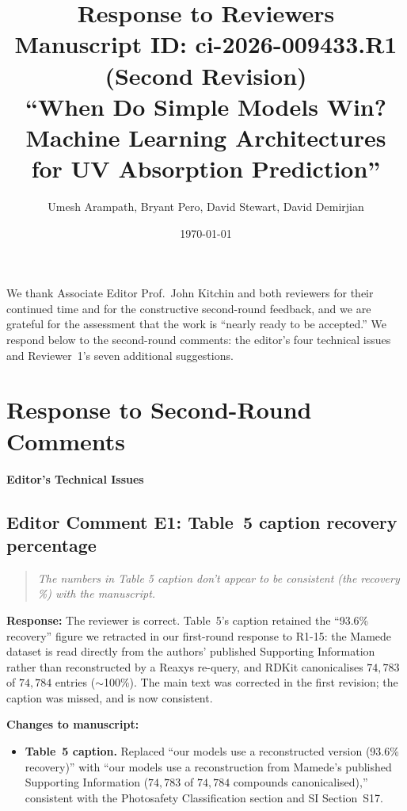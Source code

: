 \documentclass[11pt]{article}
\title{Response to Reviewers\\
\large Manuscript ID: ci-2026-009433.R1 (Second Revision)\\
``When Do Simple Models Win? Machine Learning Architectures for UV Absorption Prediction''}
\author{Umesh Arampath, Bryant Pero, David Stewart, David Demirjian}
\date{\today}
\newenvironment{reviewer}{%
  \begin{quote}\itshape\color{black!70}}{%
  \end{quote}}
\newcommand{\response}[1]{\noindent\textbf{Response:} #1\par\medskip}
\newenvironment{changes}{%
  \noindent\textbf{Changes to manuscript:}
  \begin{itemize}[leftmargin=2em,itemsep=2pt]}{%
  \end{itemize}\medskip}
\begin{document}
\maketitle

We thank Associate Editor Prof.\ John Kitchin and both reviewers for their continued time and for the constructive second-round feedback, and we are grateful for the assessment that the work is ``nearly ready to be accepted.'' We respond below to the second-round comments: the editor's four technical issues and Reviewer~1's seven additional suggestions.

\clearpage

\section*{Response to Second-Round Comments}

\bigskip
\noindent\textbf{\large Editor's Technical Issues}
\medskip

\subsection*{Editor Comment E1: Table~5 caption recovery percentage}
\begin{reviewer}
The numbers in Table 5 caption don't appear to be consistent (the recovery \%) with the manuscript.
\end{reviewer}
\response{The reviewer is correct. Table~5's caption retained the ``93.6\% recovery'' figure we retracted in our first-round response to R1-15: the Mamede dataset is read directly from the authors' published Supporting Information rather than reconstructed by a Reaxys re-query, and RDKit canonicalises $74{,}783$ of $74{,}784$ entries ($\sim$100\%). The main text was corrected in the first revision; the caption was missed, and is now consistent.}
\begin{changes}
  \item \textbf{Table~5 caption.} Replaced ``our models use a reconstructed version (93.6\% recovery)'' with ``our models use a reconstruction from Mamede's published Supporting Information ($74{,}783$ of $74{,}784$ compounds canonicalised),'' consistent with the Photosafety Classification section and SI Section~S17.
\end{changes}
\end{document}
